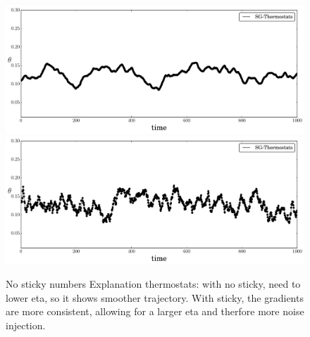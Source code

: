 \documentclass[]{article}
\begin{document}
\begin{figure}[t]
\begin{center}
\includegraphics[width=0.95\columnwidth]{./images/exp-SG-Thermostats-theta-timeseries-omega-rate-100p0-chain0.pdf}
\includegraphics[width=0.95\columnwidth]{./images/exp-SG-Thermostats-theta-timeseries-omega-rate-0p01-chain0.pdf}
\caption{\small{No sticky numbers  Explanation thermostats: with no sticky, need to lower eta, so it shows smoother trajectory.  With sticky, the gradients are more consistent, allowing for a larger eta and therfore more noise injection.}}
\label{fig:exp-theta-traces}
\end{center}
\vskip -0.2in
\end{figure}

\end{document}
